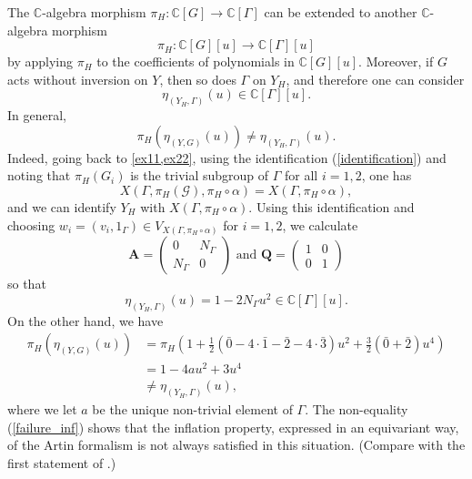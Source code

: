 \documentclass[11pt]{amsart}
\numberwithin{equation}{section}
\theoremstyle{remark}
\theoremstyle{definition}
\begin{document}
The $\mathbb{C}$-algebra morphism $\pi_{H}:\mathbb{C}[G] \rightarrow \mathbb{C}[\Gamma]$ can be extended to another $\mathbb{C}$-algebra morphism
$$\pi_{H}:\mathbb{C}[G][u] \rightarrow \mathbb{C}[\Gamma][u]$$
by applying $\pi_{H}$ to the coefficients of polynomials in $\mathbb{C}[G][u]$.  Moreover, if $G$ acts without inversion on $Y$, then so does $\Gamma$ on $Y_{H}$, and therefore one can consider
$$\eta_{(Y_{H},\Gamma)}(u) \in \mathbb{C}[\Gamma] [u]. $$
In general, 
\begin{equation} \label{failure_inf}
\pi_{H}(\eta_{(Y,G)}(u)) \neq \eta_{(Y_{H},\Gamma)}(u).
\end{equation}
Indeed, going back to \cref{ex11,ex22}, using the identification (\ref{identification}) and noting that $\pi_{H}(G_{i})$ is the trivial subgroup of $\Gamma$ for all $i = 1,2$, one has
$$X(\Gamma,\pi_{H}(\mathcal{G}),\pi_{H} \circ \alpha) = X(\Gamma,\pi_{H} \circ \alpha), $$
and we can identify $Y_{H}$ with $X(\Gamma, \pi_{H} \circ \alpha)$.  Using this identification and choosing $w_{i} = (v_{i},1_{\Gamma}) \in V_{X(\Gamma, \pi_{H} \circ \alpha)}$ for $i=1,2$, we calculate
\begin{equation*}
\mathbf{A} = \begin{pmatrix} 0 & {N_{\Gamma}} \\ N_{\Gamma} & 0 \end{pmatrix}
\text{ and }
\mathbf{Q} = \begin{pmatrix} 1 & 0 \\ 0&1 \end{pmatrix}
\end{equation*}
so that
$$\eta_{(Y_{H},\Gamma)}(u) = 1 - 2N_{\Gamma}u^{2} \in \mathbb{C}[\Gamma][u]. $$
On the other hand, we have
\begin{equation*}
\begin{aligned} 
\pi_{H} \left(\eta_{(Y,G)}(u) \right) &= \pi_{H}\left( 1 + \frac{1}{2}(\bar{0} - 4\cdot \bar{1} - \bar{2} - 4\cdot\bar{3})u^{2} + \frac{3}{2}(\bar{0} + \bar{2})u^{4}\right) \\
&= 1 - 4 au^{2}+3 u^{4} \\
&\neq \eta_{(Y_{H},\Gamma)}(u),
\end{aligned}
\end{equation*}
where we let $a$ be the unique non-trivial element of $\Gamma$.  The non-equality (\ref{failure_inf}) shows that the inflation property, expressed in an equivariant way, of the Artin formalism is not always satisfied in this situation.  (Compare with the first statement of \cite[Proposition 1.8 on page 87]{Tate:1984}.)
\end{document}
